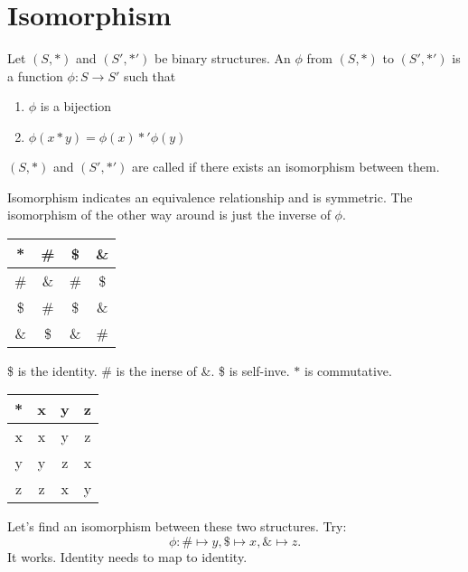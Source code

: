 \documentclass[class=article,crop=false]{standalone}
\begin{document}
\section{Isomorphism}
\begin{defn}[isomorphism]
	Let $(S,*)$ and $(S',*')$ be binary structures. An  $\phi$ from $(S,*)$ to $(S',*')$ is a function
	$\phi:S\to S'$ such that
	\begin{enumerate}[label=(\roman*)]
		\item $\phi$ is a bijection
		\item $\phi(x*y) = \phi(x) *' \phi(y)  $
	\end{enumerate}
\end{defn}

\begin{defn}[isomorphic]
	$(S,*)$ and  $(S',*')$ are called  if there exists an isomorphism between them. 
\end{defn}
\begin{remark}
Isomorphism indicates an equivalence relationship and is symmetric. The isomorphism of the other way around is just the inverse of $\phi$.
\end{remark}
\begin{eg}[3.2]
\begin{table}[htpb]
	\centering
	\begin{tabular}{c||c|c|c}
		*& \# & \$ & \&\\
		\hline\hline
		\#& \& & \# & \$\\
		\hline
		\$ & \# & \$ & \&\\
		\hline
		\& & \$ & \& & \#
	\end{tabular}
\end{table}
\$ is the identity.  \# is the inerse of \&.  \$ is self-inve. $*$ is commutative.   
\end{eg}

\begin{eg}[3.3]
\begin{table}[htpb]
	\centering
	\begin{tabular}{c||c|c|c}
		*& x & y & z\\
		\hline\hline
		x& x & y & z\\
		\hline
		y & y & z & x\\
		\hline
		z & z & x & y
	\end{tabular}
\end{table}
\end{eg}
Let's find an isomorphism between these two structures. Try:
\[
	\phi:\# \mapsto y, \$ \mapsto x,\&\mapsto z
.\] 
It works. Identity needs to map to identity.\\
\end{document}
